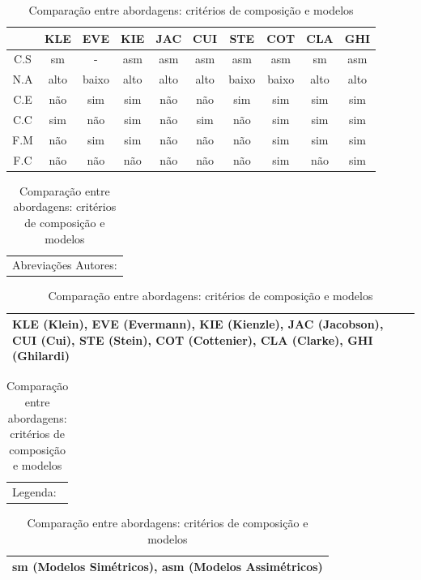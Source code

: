 \begin{table}[h]
	\centering
	\begin{tabular}{ | c | c | c | c | c | c | c | c | c | c | }
		\hline
		 & KLE & EVE & KIE & JAC & CUI & STE & COT & CLA & GHI \\
		\hline
		 C.S & sm & - & asm & asm & asm & asm & asm & sm & asm \\
		\hline
		 N.A & alto & baixo & alto & alto & alto & baixo & baixo & alto & alto \\
		\hline
		 C.E & não & sim & sim & não & não & sim & sim & sim & sim \\
		\hline
		 C.C & sim & não & sim & não & sim & não & sim & sim & sim \\
		\hline
		 F.M & não & sim & sim & não & não & não & sim & sim & sim \\
		\hline
		 F.C & não & não & não & não & não & não & sim & não & sim  \\
		\hline
	\end{tabular}
	
	\hspace{2em}

	\begin{tabular}{  p{12cm}  }
		Abreviações Autores: \\
	\end{tabular}
	
	\begin{tabular}{ | p{12cm} | }
		\hline
		KLE (Klein), EVE (Evermann), KIE (Kienzle), JAC (Jacobson), CUI (Cui), STE (Stein), COT (Cottenier), CLA (Clarke), GHI (Ghilardi) \\
		\hline
	\end{tabular}

	\begin{tabular}{  p{12cm}  }
		Legenda: \\
	\end{tabular}

	\begin{tabular}{ | p{12cm} | }
		\hline
		sm (Modelos Simétricos), asm (Modelos Assimétricos) \\
		\hline
	\end{tabular}
	\caption{Comparação entre abordagens: critérios de composição e modelos}
	\label{tab:comparison_table_models}
\end{table} 


